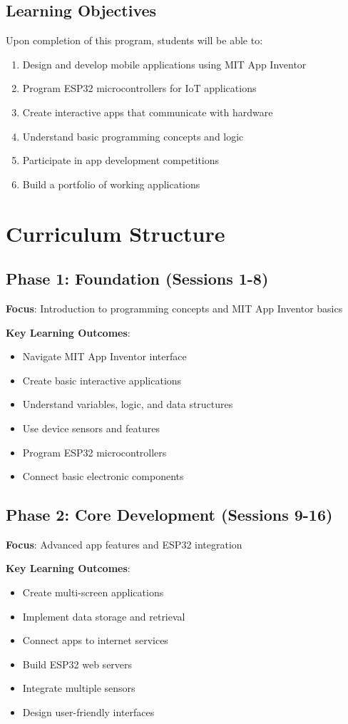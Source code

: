 \documentclass[12pt,a4paper]{article}
\begin{document}
\subsection{Learning Objectives}
Upon completion of this program, students will be able to:
\begin{enumerate}
    \item Design and develop mobile applications using MIT App Inventor
    \item Program ESP32 microcontrollers for IoT applications
    \item Create interactive apps that communicate with hardware
    \item Understand basic programming concepts and logic
    \item Participate in app development competitions
    \item Build a portfolio of working applications
\end{enumerate}

\section{Curriculum Structure}

\subsection{Phase 1: Foundation (Sessions 1-8)}
\textbf{Focus}: Introduction to programming concepts and MIT App Inventor basics

\textbf{Key Learning Outcomes}:
\begin{itemize}
    \item Navigate MIT App Inventor interface
    \item Create basic interactive applications
    \item Understand variables, logic, and data structures
    \item Use device sensors and features
    \item Program ESP32 microcontrollers
    \item Connect basic electronic components
\end{itemize}

\subsection{Phase 2: Core Development (Sessions 9-16)}
\textbf{Focus}: Advanced app features and ESP32 integration

\textbf{Key Learning Outcomes}:
\begin{itemize}
    \item Create multi-screen applications
    \item Implement data storage and retrieval
    \item Connect apps to internet services
    \item Build ESP32 web servers
    \item Integrate multiple sensors
    \item Design user-friendly interfaces
\end{itemize}
\end{document}
